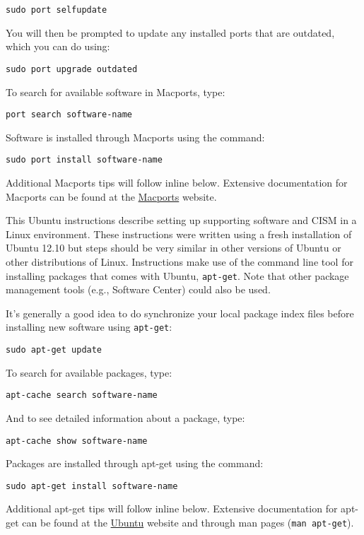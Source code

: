 \begin{mdframed}[style=mac]
\texttt{sudo port selfupdate}

You will then be prompted to update any installed ports that are outdated, which you can do using:

\texttt{sudo port upgrade outdated}

To search for available software in Macports, type: 

\texttt{port search software-name}

Software is installed through Macports using the command:

\texttt{sudo port install software-name}

Additional Macports tips will follow inline below. Extensive documentation for Macports 
can be found at the \href{http://guide.macports.org}{Macports} website.
\end{mdframed}              %


\begin{mdframed}[style=ubuntu] %
This Ubuntu instructions describe setting up supporting software and CISM in a Linux environment.
These instructions were written using a fresh installation of Ubuntu 12.10 but 
steps should be very similar in other versions of Ubuntu or other distributions of Linux.
Instructions make use of the command line tool for installing packages that comes with Ubuntu, 
\texttt{apt-get}.  Note that other package management tools (e.g., Software Center)
could also be used.

It's generally a good idea to do synchronize your local package index files before
installing new software using \texttt{apt-get}:

\texttt{sudo apt-get update}

To search for available packages, type:

\texttt{apt-cache search software-name}

And to see detailed information about a package, type:

\texttt{apt-cache show software-name}

Packages are installed through apt-get using the command:

\texttt{sudo apt-get install software-name}

Additional apt-get tips will follow inline below. Extensive documentation for apt-get 
can be found at the \href{https://help.ubuntu.com/community/AptGet/Howto}{Ubuntu} website
and through man pages (\texttt{man apt-get}).
\end{mdframed}                 %



